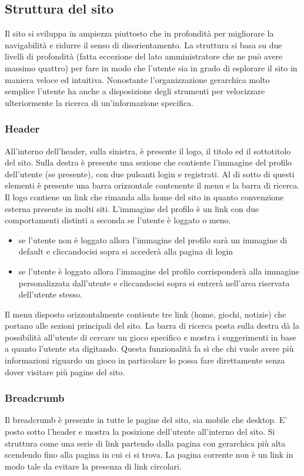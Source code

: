 \subsection{Struttura del sito}

Il sito si sviluppa in ampiezza piuttosto che in profondità per migliorare la navigabilità e ridurre il senso di disorientamento. La struttura si basa su due livelli di profondità (fatta eccezione del lato amministratore che ne può avere massimo quattro) per fare in modo che l'utente sia in grado di esplorare il sito in maniera veloce ed intuitiva. Nonostante l'organizzazione gerarchica molto semplice l'utente ha anche a disposizione degli strumenti per velocizzare ulteriormente la ricerca di un'informazione specifica.

\subsubsection{Header}
All'interno dell'header, sulla sinistra, è presente il logo, il titolo ed il sottotitolo del sito. Sulla destra è presente una sezione che contiente l'immagine del profilo dell'utente (se presente), con due pulsanti login e registrati. Al di sotto di questi elementi è presente una barra orizzontale contenente il menu e la barra di ricerca.
Il logo contiene un link che rimanda alla home del sito in quanto convenzione esterna presente in molti siti.
L'immagine del profilo è un link con due comportamenti distinti a seconda se l'utente è loggato o meno.
\begin{itemize}
	\item se l'utente non è loggato allora l'immagine del profilo sarà un immagine di default e cliccandocisi sopra si accederà alla pagina di login
	\item se l'utente è loggato allora l'immagine del profilo corrisponderà alla immagine personalizzata dall'utente e cliccandocisi sopra si entrerà nell'area riservata dell'utente stesso.   
\end{itemize}


Il menu disposto orizzontalmente contiente tre link (home, giochi, notizie) che portano alle sezioni principali del sito.
La barra di ricerca posta sulla destra dà la possibilità all'utente di cercare un gioco specifico e mostra i suggerimenti in base a quanto l'utente sta digitando. Questa funzionalità fa sì che chi vuole avere più informazioni riguardo un gioco in particolare lo possa fare direttamente senza dover visitare più pagine del sito.

\subsubsection{Breadcrumb}
Il breadcrumb è presente in tutte le pagine del sito, sia mobile che desktop.
E' posto sotto l'header e mostra la posizione dell'utente all'interno del sito. Si struttura come una serie di link partendo dalla pagina con gerarchica più alta scendendo fino alla pagina in cui ci si trova. La pagina corrente non è un link in modo tale da evitare la presenza di link circolari.

